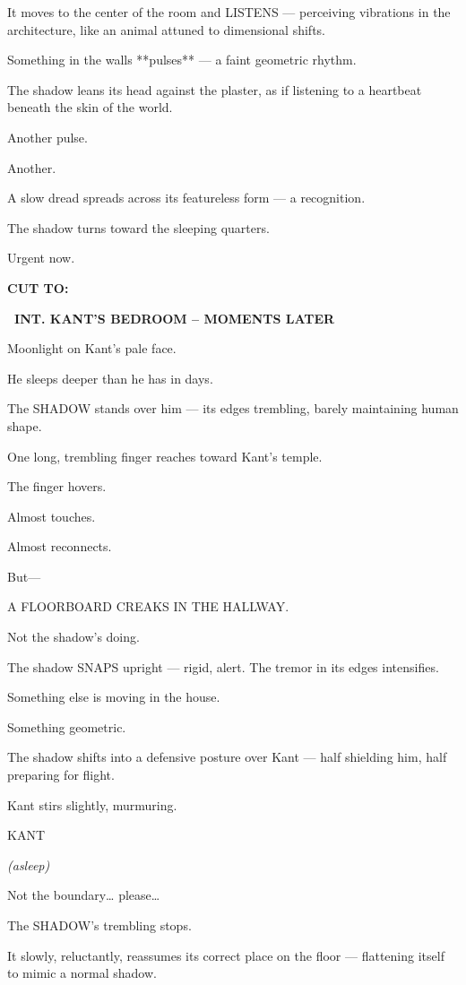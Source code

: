 \documentclass[12pt]{article}
\newcommand{\scene}[2]{%
  \vspace{1.8\baselineskip}%
  \noindent\textbf{#1 \ #2}\par\vspace{0.4\baselineskip}%
}
\newenvironment{dialogue}[1]{%
  \vspace{0.8\baselineskip}%
  \noindent\hspace*{2.3in}\textsc{#1}\par%
  \noindent\hspace*{1.5in}\begin{minipage}[t]{4.5in}%
}{%
  \end{minipage}\par%
}
\newcommand{\paren}[1]{%
  \noindent\hspace*{1.8in}\textit{(#1)}\par%
}
\newcommand{\transition}[1]{%
  \vspace{0.6\baselineskip}%
  \begin{flushright}\textbf{#1}\end{flushright}%
}
\begin{document}
It moves to the center of the room and LISTENS —
perceiving vibrations in the architecture,
like an animal attuned to dimensional shifts.

Something in the walls **pulses** —
a faint geometric rhythm.

The shadow leans its head against the plaster,
as if listening to a heartbeat beneath the skin of the world.

Another pulse.

Another.

A slow dread spreads across its featureless form
— a recognition.

The shadow turns toward the sleeping quarters.

Urgent now.

\transition{CUT TO:}


\scene{}{INT. KANT'S BEDROOM -- MOMENTS LATER}

Moonlight on Kant’s pale face.

He sleeps deeper than he has in days.

The SHADOW stands over him —
its edges trembling,
barely maintaining human shape.

One long, trembling finger reaches toward Kant’s temple.

The finger hovers.

Almost touches.

Almost reconnects.

But—

A FLOORBOARD CREAKS IN THE HALLWAY.

Not the shadow’s doing.

The shadow SNAPS upright —
rigid, alert.
The tremor in its edges intensifies.

Something else is moving in the house.

Something geometric.

The shadow shifts into a defensive posture over Kant —
half shielding him, half preparing for flight.

Kant stirs slightly, murmuring.

\begin{dialogue}{KANT}
\paren{asleep}
Not the boundary…
please…
\end{dialogue}

The SHADOW’s trembling stops.

It slowly, reluctantly, reassumes its correct place on the floor —
flattening itself to mimic a normal shadow.
\end{document}
